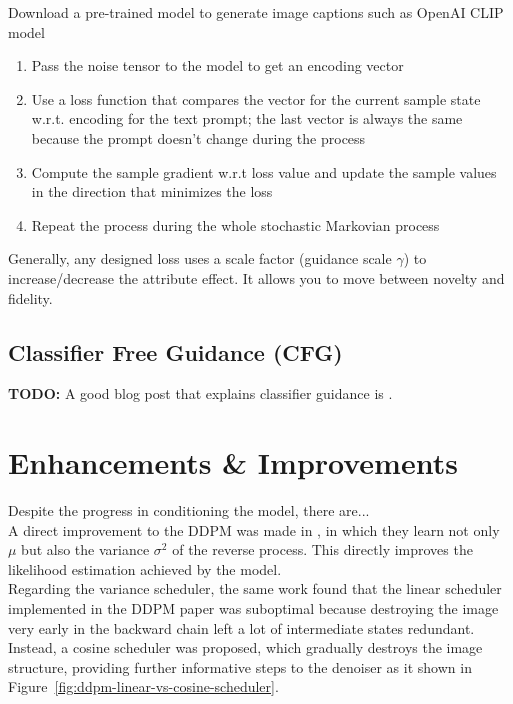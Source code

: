   Download a pre-trained model to generate image captions such as OpenAI CLIP model
  
  \begin{enumerate}
    \item Pass the noise tensor to the model to get an encoding vector
    \item Use a loss function that compares the vector for the current sample state w.r.t. encoding for the text prompt; the last vector is always the same because the prompt doesn’t change during the process
    \item Compute the sample gradient w.r.t loss value and update the sample values in the direction that minimizes the loss
    \item Repeat the process during the whole stochastic Markovian process
  \end{enumerate}

Generally, any designed loss uses a scale factor (guidance scale $\gamma$) to increase/decrease the attribute effect. It allows you to move between novelty and fidelity. 

\subsection{Classifier Free Guidance (CFG)}

    \textbf{TODO:} A good blog post that explains classifier guidance is \cite{dieleman2022guidance}. \\


\section{Enhancements \& Improvements}

Despite the progress in conditioning the model, there are...\\

\noindent A direct improvement to the DDPM was made in \cite{nichol2021improved}, in which they learn not only $\mu$ but also the variance $\sigma^{2}$ of the reverse process. This directly improves the likelihood estimation achieved by the model. \\
\noindent Regarding the variance scheduler, the same work found that the linear scheduler implemented in the DDPM paper was suboptimal because destroying the image very early in the backward chain left a lot of intermediate states redundant. Instead, a cosine scheduler was proposed, which gradually destroys the image structure, providing further informative steps to the denoiser as it shown in Figure~\ref{fig:ddpm-linear-vs-cosine-scheduler}. \\

